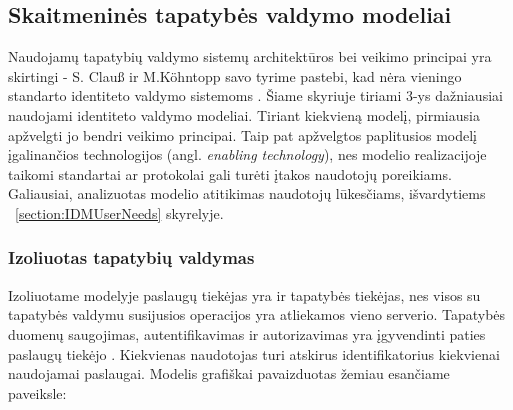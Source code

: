 

\subsection{Skaitmeninės tapatybės valdymo modeliai}

Naudojamų tapatybių valdymo sistemų architektūros bei veikimo principai yra skirtingi -  S. Clauß ir M.Köhntopp savo tyrime pastebi,
kad nėra vieningo standarto identiteto valdymo sistemoms \cite{Claus2001}. Šiame skyriuje tiriami 3-ys dažniausiai naudojami identiteto valdymo
modeliai. Tiriant kiekvieną modelį, pirmiausia apžvelgti jo bendri veikimo principai. Taip pat apžvelgtos paplitusios modelį įgalinančios technologijos
(angl. \textit{enabling technology}),
nes modelio realizacijoje taikomi standartai ar protokolai gali turėti įtakos naudotojų poreikiams. Galiausiai, analizuotas modelio atitikimas naudotojų lūkesčiams,
išvardytiems ~\ref{section:IDMUserNeeds} skyrelyje.

\subsubsection{Izoliuotas tapatybių valdymas}


Izoliuotame modelyje paslaugų tiekėjas yra ir tapatybės tiekėjas, nes visos su tapatybės valdymu
susijusios operacijos yra atliekamos vieno serverio. Tapatybės duomenų saugojimas, autentifikavimas
ir autorizavimas yra įgyvendinti paties paslaugų tiekėjo \cite{Cao2010}. Kiekvienas naudotojas turi atskirus identifikatorius
kiekvienai naudojamai paslaugai. Modelis grafiškai pavaizduotas žemiau esančiame paveiksle:

